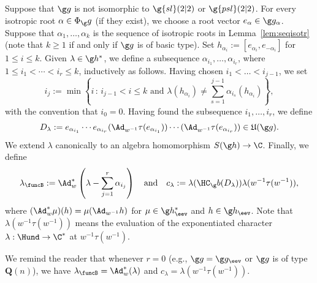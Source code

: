 \documentclass[12pt]{amsart}
\begin{document}
Suppose that $\g g$ is  not isomorphic to $\g{sl}(2|2)$ or $\g{psl}(2|2)$. 
 For every isotropic root $\alpha\in\Phi_\g g$ (if they exist), we choose a root vector   $e_{\alpha}\in\g g_{\alpha}$. Suppose that $\alpha_1,\ldots,\alpha_k$ is the sequence of isotropic roots in Lemma~\ref{lem:seqisotr} (note that $k\geq 1 $ if and only if  $\g g$ is of basic type).  
Set $h_{\alpha_i}:=[e_{\alpha_i},e_{-\alpha_i}]$ for $1\leq i\leq k$. 
Given $\lambda\in \g h^*$, we define a subsequence $\alpha_{i_1},\ldots,\alpha_{i_r}$, where $1\leq i_1<\cdots< i_r\leq k$, inductively as follows. Having chosen $i_1<\ldots<i_{j-1}$,  we set \begin{equation}
\label{eq:lambdaseq}
i_j:=\min\left\{ i\,:\,
i_{j-1}<i\leq k\text{ and }
\lambda\left(h_{\alpha_i}\right)\neq \sum_{s=1}^{j-1}\alpha_{i_s}\left(h_{\alpha_{i}}\right)\right\},
\end{equation}
with the convention that $i_0=0$. Having found  the subsequence $i_1,\ldots,i_r$, we define 
\begin{equation}
\label{eqDlam}
D_\lambda:=e_{\alpha_{i_1}}\cdots e_{\alpha_{i_r}}(\Ad_{w^{-1}}^{}\tau(e_{\alpha_{i_1}}))\cdots (\Ad_{w^{-1}}^{}\tau(e_{\alpha_{i_r}}))\in \mathfrak  U(\g g).
\end{equation}
We extend $\lambda$ canonically to an algebra homomorphism $S(\g h)\to\C$. 
Finally, we define
\begin{equation}
\label{eq:lambdaB-clam}
\lambda_\funcB:=
\Ad^*_w\left(\lambda-\sum_{j=1}^r\alpha_{i_j}
\right)\quad\text{and}\quad
c_\lambda:=\lambda(\HC_\g b(D_\lambda))\lambda(w^{-1}\tau(w^{-1})),
\end{equation}
where $(\Ad^*_w\mu)
(h)=\mu(\Ad_{w^{-1}}h)$ for $\mu\in\g h_\eev^*$ and $h\in\g h_\eev$. Note that $\lambda(w^{-1}\tau(w^{-1}))$ means the evaluation of the exponentiated character $\lambda:\Hund\to\C^*$ at $w^{-1}\tau(w^{-1})$.
\begin{rmk}
We remind the reader that whenever $r=0$ (e.g., $\g g=\g g_\eev$ or  $\g g$ is of type $\mathbf Q(n)$),  we have $\lambda_\funcB=\Ad_w^*(\lambda)$ and $c_\lambda=\lambda(w^{-1}\tau(w^{-1}))$.
\end{rmk}
\end{document}
